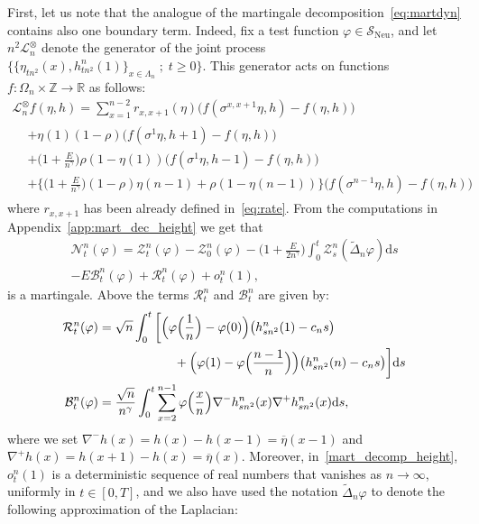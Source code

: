 \documentclass[10pt]{amsart}
\theoremstyle{definition}\newtheorem{defi}[theo]{Definition}\newtheorem{rema}[theo]{Remark}\newtheorem{exam}[theo]{Example}\newtheorem{exem}[theo]{Example}\newtheorem{nota}[theo]{Notation}
\DeclareMathOperator{\Neu}{Neu}
\newcommand{\bb}[1]{{\mathbb #1}}
\newcommand{\mc}[1]{{\mathcal #1}}
\renewcommand{\mc}[1]{{\mathcal #1}}
\renewcommand{\bar}{\overline}
\renewcommand{\geq}{\geqslant}
\renewcommand{\tilde}{\widetilde}
\newcommand*{\dd}{\mathrm{d}}
\newcommand*{\ds}{\dd s}
\renewcommand{\tfrac}{\frac}
\begin{document}
First, let us note that the analogue of the martingale decomposition~\eqref{eq:martdyn} contains also one boundary term. Indeed, fix a test function $\varphi\in\mc S_{\Neu}$, and let $n^2\mc L_n^{\otimes}$ denote the generator of the joint process $\big\{ \{\eta_{tn^2}(x),h_{{t n^2}}^n(1)\}_{x\in\Lambda_n}\; ; \; t\geq 0 \big\}$. This generator acts on functions $f:\Omega_n \times \bb Z \to \bb R$ as follows:
\begin{multline}
\mc L_n^\otimes f(\eta,h) = \sum_{x=1}^{n-2} r_{x,x+1}(\eta) \Big(f(\sigma^{x,x+1}\eta,h)-f(\eta,h)\Big)\\
\begin{aligned}
& +\eta(1)(1-\rho)\Big(f(\sigma^1\eta,h+1)-f(\eta,h)\Big) \\
& +\Big(1+\frac{E}{n^\gamma}\Big)\rho(1-\eta(1))\Big(f(\sigma^1\eta,h-1)-f(\eta,h)\Big)\\
& + \Big\{\Big(1+\frac{E}{n^\gamma}\Big)(1-\rho)\eta(n-1)+\rho(1-\eta(n-1))\Big\}\Big(f(\sigma^{n-1}\eta,h)-f(\eta,h)\Big)
\label{eq:joint_gen}
\end{aligned}
\end{multline}
where $r_{x,x+1}$ has been already defined in~\eqref{eq:rate}. From the computations in Appendix~\ref{app:mart_dec_height} we get that
\begin{multline}
\mc N_t^n(\varphi)= \mathcal{Z}_t^n(\varphi)-\mathcal{Z}_0^n(\varphi)-\Big(1+\frac{E}{2n^\gamma}\Big)\int_0^t\mc Z_s^n(\tilde\Delta_n\varphi) \ds\\ - E{\mc B_t^n(\varphi)}+{\mc R_t^n(\varphi)}+o^n_t(1),\label{mart_decomp_height}
\end{multline}
is a martingale. Above the terms $\mc R_t^n$ and $\mc B_t^n$ are given by:
\begin{align}\label{eq:height-remainder_new}
\mc R^n_t(\varphi) &= \sqrt n \int_0^t \bigg[\Big(\varphi \Big(\tfrac{1}{n} \Big) - \varphi (0) \Big) \big(h^n_{{sn^2}}(1)-c_n s\big) \\
& \qquad \qquad \qquad +\Big(\varphi (1) - \varphi \Big(\tfrac{n - 1}{n} \Big) \Big)
\big(h^n_{{sn^2}} (n)-c_ns\big)\bigg] \ds \notag\\
\mc B^n_t(\varphi) &= \frac{\sqrt n}{n^\gamma} \int_0^t\sum_{x = 2}^{n-1} \varphi \Big(\tfrac{x}{n} \Big) \nabla^- h^n_{{sn^2}} (x) \nabla^+ h^n_{{sn^2}} (x) \ds, \notag
\end{align}
where we set $\nabla^- h(x) = h(x) - h(x-1) =\bar\eta(x-1)$ and $\nabla^+ h(x) = h(x+1) - h(x) =\bar\eta(x)$. Moreover, in~\eqref{mart_decomp_height}, $o^n_t(1)$ is a deterministic sequence of real numbers that vanishes as $n\to \infty$, uniformly in $t\in[0,T]$, and we also have used the notation $\tilde\Delta_n\varphi$ to denote the following approximation of the Laplacian:
\end{document}

